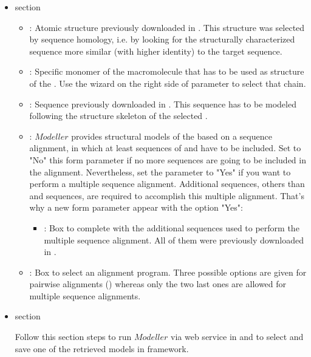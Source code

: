 \begin{itemize}
  \begin{itemize}
   \item {} section
  

  \begin{itemize}
   \item {}: Atomic structure previously downloaded in \scipion. This structure was selected by sequence homology, i.e. by looking for the structurally characterized sequence more similar (with higher identity) to the target sequence.
   \item {}: Specific monomer of the macromolecule that has to be used as structure  of the . Use the wizard on the right side of  parameter to select that chain.
   \item {}: Sequence previously downloaded in \scipion. This sequence has to be modeled following the structure skeleton of the selected .
   \item {}: $Modeller$ provides structural models of the  based on a sequence alignment, in which at least sequences of  and  have to be included. Set to "No" this form parameter if no more sequences are going to be included in the alignment. Nevertheless, set the parameter to "Yes" if you want to perform a multiple sequence alignment. Additional sequences, others than  and  sequences, are required to accomplish this multiple alignment. That's why a new form parameter appear with the option "Yes":
    \begin{itemize}
	 \item {}: Box to complete with the additional sequences used to perform the multiple sequence alignment. All of them were previously downloaded in \scipion.
	\end{itemize}
   \item {}: Box to select an alignment program. Three possible options are given for pairwise alignments () whereas only the two last ones are allowed for multiple sequence alignments.
   \end{itemize}
   
  \item {} section
  
  Follow this section steps to run $Modeller$ via web service in \chimera and to select and save one of the retrieved models in \scipion framework.
  

\end{itemize}
\end{itemize}
